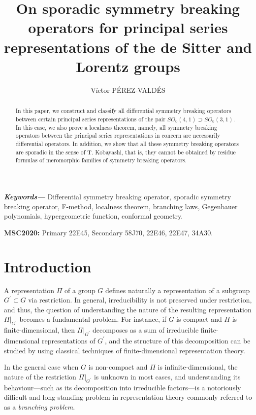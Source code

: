 \documentclass[12pt, pdflatex, a4paper]{article}
\title{On sporadic symmetry breaking operators for principal series representations of the de Sitter and Lorentz groups}
\author{V\'{i}ctor P\'{E}REZ-VALD\'{E}S}
\date{}
\theoremstyle{plain}
\theoremstyle{definition}
\providecommand{\keywords}[1]
{
  \small	
  \textbf{\textit{Keywords---}} #1
}
\begin{document}
\maketitle
\vspace*{-1cm} %
\begin{abstract}
In this paper, we construct and classify all differential symmetry breaking operators between certain principal series representations of the pair $SO_0(4,1) \supset SO_0(3,1)$. In this case, we also prove a localness theorem, namely, all symmetry breaking operators between the principal series representations in concern are necessarily differential operators. In addition, we show that all these symmetry breaking operators are sporadic in the sense of T. Kobayashi, that is, they cannot be obtained by residue formulas of meromorphic families of symmetry breaking operators.
\end{abstract}
\keywords{Differential symmetry breaking operator, sporadic symmetry breaking operator, F-method, localness theorem, branching laws, Gegenbauer polynomials, hypergeometric function, conformal geometry.}
\begin{flushleft}
\textbf{MSC2020:} Primary 22E45, Secondary 58J70, 22E46, 22E47, 34A30.
\end{flushleft}



\renewcommand{\contentsname}{Table of contents}
\tableofcontents


\section{Introduction}

A representation $\Pi$ of a group $G$ defines naturally a representation of a subgroup $G^\prime \subset G$ via restriction. In general, irreducibility is not preserved under restriction, and thus, the question of understanding the nature of the resulting representation $\Pi\big\rvert_{G^\prime}$ becomes a fundamental problem. For instance, if $G$ is compact and $\Pi$ is finite-dimensional, then $\Pi\big\rvert_{G^\prime}$ decomposes as a sum of irreducible finite-dimensional representations of $G^\prime$, and the structure of this decomposition can be studied by using classical techniques of finite-dimensional representation theory. 

In the general case when $G$ is non-compact and $\Pi$ is infinite-dimensional, the nature of the restriction $\Pi\big\rvert_{G^\prime}$ is unknown in most cases, and understanding its behaviour—such as its decomposition into irreducible factors—is a notoriously difficult and long-standing problem in representation theory commonly referred to as a \emph{branching problem}. 
\end{document}

